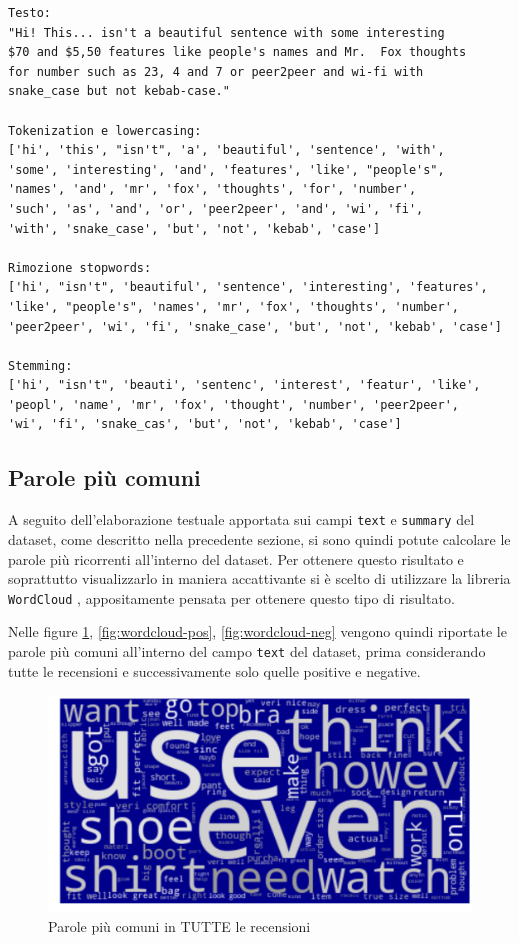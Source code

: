 \documentclass[hidelinks, 12pt]{article}
\begin{document}
\begin{verbatim}
Testo:
"Hi! This... isn't a beautiful sentence with some interesting 
$70 and $5,50 features like people's names and Mr.  Fox thoughts 
for number such as 23, 4 and 7 or peer2peer and wi-fi with 
snake_case but not kebab-case."

Tokenization e lowercasing:
['hi', 'this', "isn't", 'a', 'beautiful', 'sentence', 'with', 
'some', 'interesting', 'and', 'features', 'like', "people's", 
'names', 'and', 'mr', 'fox', 'thoughts', 'for', 'number', 
'such', 'as', 'and', 'or', 'peer2peer', 'and', 'wi', 'fi', 
'with', 'snake_case', 'but', 'not', 'kebab', 'case']

Rimozione stopwords:
['hi', "isn't", 'beautiful', 'sentence', 'interesting', 'features', 
'like', "people's", 'names', 'mr', 'fox', 'thoughts', 'number', 
'peer2peer', 'wi', 'fi', 'snake_case', 'but', 'not', 'kebab', 'case']

Stemming:
['hi', "isn't", 'beauti', 'sentenc', 'interest', 'featur', 'like', 
'peopl', 'name', 'mr', 'fox', 'thought', 'number', 'peer2peer', 
'wi', 'fi', 'snake_cas', 'but', 'not', 'kebab', 'case']
\end{verbatim}



\subsection{Parole più comuni}

A seguito dell'elaborazione testuale apportata sui campi \texttt{text} e \texttt{summary} del dataset, come descritto nella precedente sezione, si sono quindi potute calcolare le parole più ricorrenti all'interno del dataset. Per ottenere questo risultato e soprattutto visualizzarlo in maniera accattivante si è scelto di utilizzare la libreria \texttt{WordCloud} \cite{site:wordcloud}, appositamente pensata per ottenere questo tipo di risultato.

Nelle figure \ref{fig:wordcloud-all}, \ref{fig:wordcloud-pos}, \ref{fig:wordcloud-neg} vengono quindi riportate le parole più comuni all'interno del campo \texttt{text} del dataset, prima considerando tutte le recensioni e successivamente solo quelle positive e negative.

\begin{figure}[H]
	\centering
	\includegraphics[scale=0.36]{images/04_01_wordcloud_all.png}
	\caption[Parole più comuni in TUTTE le recensioni]{Parole più comuni in TUTTE le recensioni}
	\label{fig:wordcloud-all}
\end{figure}
\end{document}
